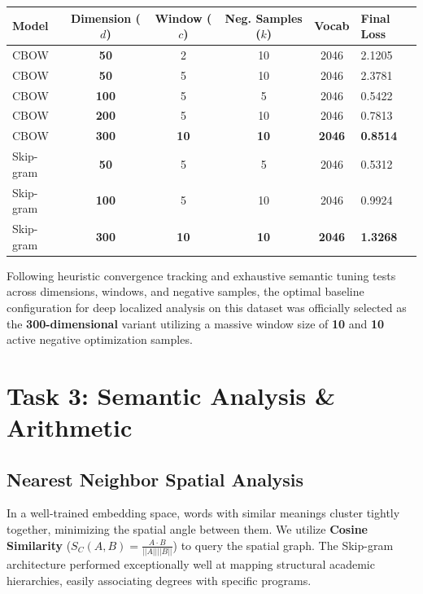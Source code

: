 \documentclass[11pt,a4paper]{article}
\begin{document}
\begin{center}
\renewcommand{\arraystretch}{1.2}
\begin{tabular}{@{} l c c c c l @{}}
    \toprule
    \textbf{\color{iitjblue} Model} & \textbf{\color{iitjblue} Dimension ($d$)} & \textbf{\color{iitjblue} Window ($c$)} & \textbf{\color{iitjblue} Neg. Samples ($k$)} & \textbf{\color{iitjblue} Vocab} & \textbf{\color{iitjblue} Final Loss} \\
    \midrule
    CBOW & \textbf{50} & 2 & 10 & 2046 & 2.1205 \\
    CBOW & \textbf{50} & 5 & 10 & 2046 & 2.3781 \\
    CBOW & \textbf{100} & 5 & 5 & 2046 & 0.5422 \\
    CBOW & \textbf{200} & 5 & 10 & 2046 & 0.7813 \\
    \rowcolor{highlightbg}
    CBOW & \textbf{300} & \textbf{10} & \textbf{10} & \textbf{2046} & \textbf{0.8514} \\
    Skip-gram & \textbf{50} & 5 & 5 & 2046 & 0.5312 \\
    Skip-gram & \textbf{100} & 5 & 10 & 2046 & 0.9924 \\
    \rowcolor{highlightbg}
    Skip-gram & \textbf{300} & \textbf{10} & \textbf{10} & \textbf{2046} & \textbf{1.3268} \\
    \bottomrule
\end{tabular}
\end{center}

\begin{infoBox}
Following heuristic convergence tracking and exhaustive semantic tuning tests across dimensions, windows, and negative samples, the optimal baseline configuration for deep localized analysis on this dataset was officially selected as the \textbf{300-dimensional} variant utilizing a massive window size of \textbf{10} and \textbf{10} active negative optimization samples.
\end{infoBox}

\clearpage
\section{Task 3: Semantic Analysis \& Arithmetic}

\subsection{Nearest Neighbor Spatial Analysis}
In a well-trained embedding space, words with similar meanings cluster tightly together, minimizing the spatial angle between them. We utilize \textbf{Cosine Similarity} ($S_C(A,B) = \frac{A \cdot B}{||A|| ||B||}$) to query the spatial graph. The Skip-gram architecture performed exceptionally well at mapping structural academic hierarchies, easily associating degrees with specific programs.
\end{document}
